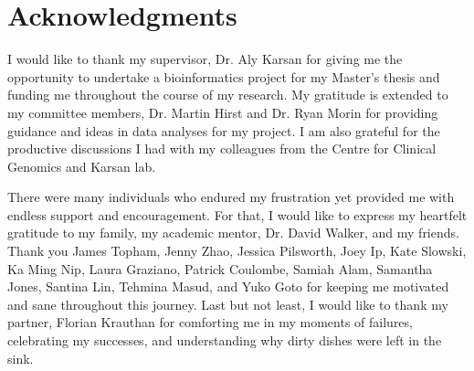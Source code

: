 
\chapter{Acknowledgments}

I would like to thank my supervisor, Dr. Aly Karsan for giving me the opportunity to undertake a bioinformatics project for my Master's thesis and funding me throughout the course of my research. My gratitude is extended to my committee members, Dr. Martin Hirst and Dr. Ryan Morin for providing guidance and ideas in data analyses for my project. I am also grateful for the productive discussions I had with my colleagues from the Centre for Clinical Genomics and Karsan lab.

There were many individuals who endured my frustration yet provided me with endless support and encouragement. For that, I would like to express my heartfelt gratitude to my family, my academic mentor, Dr. David Walker, and my friends. Thank you James Topham, Jenny Zhao, Jessica Pilsworth, Joey Ip, Kate Slowski, Ka Ming Nip, Laura Graziano, Patrick Coulombe, Samiah Alam, Samantha Jones, Santina Lin, Tehmina Masud, and Yuko Goto for keeping me motivated and sane throughout this journey. Last but not least, I would like to thank my partner, Florian Krauthan for comforting me in my moments of failures, celebrating my successes, and understanding why dirty dishes were left in the sink.
